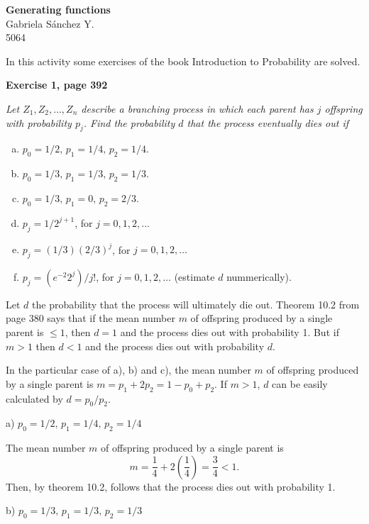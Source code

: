 \documentclass[12pt]{article}
\begin{document}
	\thispagestyle{empty}

	\begin{center}
		{\Large \bf Generating functions}\\
		Gabriela S\'anchez Y.\\
		5064
	\end{center}
  
	In this activity some exercises of the book Introduction to Probability \cite{prob2003} are solved.
	
	{\bf Exercise 1, page 392}
	
	{\em Let $Z_1, Z_2, \ldots, Z_n$ describe a branching process in which each parent has $j$ offspring with pro\-ba\-bi\-li\-ty $p_j$. Find the probability $d$ that the process eventually dies out if 
		\begin{enumerate}[a)]
			\item $p_0 = 1 / 2, \, p_1 = 1 / 4, \, p_2 = 1 / 4$.
			\item $p_0 = 1 / 3, \, p_1 = 1 / 3, \, p_2 = 1 / 3$.
			\item $p_0 = 1 / 3, \, p_1 = 0, \, p_2 = 2 / 3$.
			\item $p_j = 1 / 2^{j + 1}$, for $j = 0, 1, 2, \ldots$
			\item $p_j = (1 / 3) (2/3)^j$, for $j = 0, 1, 2, \ldots$
			\item $p_j = (e^{-2} 2^j) / j!$, for $j = 0, 1, 2, \ldots$ (estimate $d$ nummerically).
		\end{enumerate}
	}

	Let $d$ the probability that the process will ultimately die out. Theorem 10.2 from page 380 \cite{prob2003} says that if the mean number $m$ of offspring produced by a single parent is $\leq 1$, then $d = 1$ and the process dies out with probability 1. But if $m > 1$ then $d < 1$ and the process dies out with probability $d$.
	
	In the particular case of a), b) and c), the mean number $m$ of offspring produced by a single parent is $m=p_1 + 2p_2 = 1-p_0+p_2$. If $m > 1$, $d$ can be easily calculated by $d= p_0/p_2$. 
	
	\noindent a) $p_0 = 1 / 2, \, p_1 = 1 / 4, \, p_2 = 1 / 4$
	
	The mean number $m$ of offspring produced by a single parent is 
	$$m = \frac{1}{4} + 2\left( \frac{1}{4} \right)= \frac{3}{4} < 1.$$
	Then, by theorem 10.2, follows that the process dies out with probability 1.
	
	\noindent b) $p_0 = 1 / 3, \, p_1 = 1 / 3, \, p_2 = 1 / 3$
	
\end{document}
